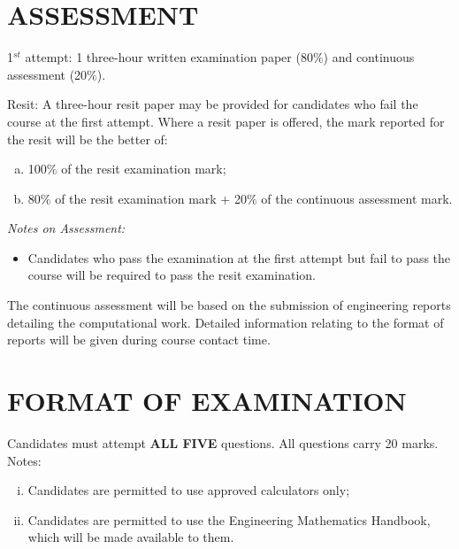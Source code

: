 \documentclass[12pts,a4paper,amsmath,amssymb,floatfix]{article}%
\begin{document}
\section{ASSESSMENT}
1$^{st}$ attempt: 1 three-hour written examination paper (80$\%$) and continuous assessment (20$\%$). 
\medskip

Resit: A three-hour resit paper may be provided for candidates who fail the course at the first attempt. Where a resit paper is offered, the mark reported for the resit will be the better of:
\begin{enumerate}[(a)]
  \item 100$\%$ of the resit examination mark;
  \item 80$\%$ of the resit examination mark + 20$\%$ of the continuous assessment mark.
\end{enumerate}
\medskip

{\it Notes on Assessment:
\begin{itemize}
\item Candidates who pass the examination at the first attempt but fail to pass the course will be required to pass the resit examination.
\end{itemize}}

\medskip

The continuous assessment will be based on the submission of engineering reports detailing the computational work. Detailed information relating to the format of reports will be given during course contact time.


\section{FORMAT OF EXAMINATION}
Candidates must attempt {\bf ALL FIVE} questions. All questions carry 20 marks. Notes:
\begin{enumerate}[(i)]
\item Candidates are permitted to use approved calculators only;
\item Candidates are permitted to use the Engineering Mathematics Handbook, which will be made available to them.
\end{enumerate}

\medskip
\end{document}
